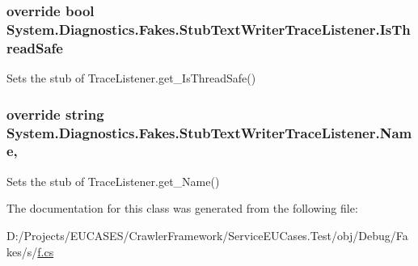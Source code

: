 \hypertarget{class_system_1_1_diagnostics_1_1_fakes_1_1_stub_text_writer_trace_listener_a860c82c764c4129de595b4f3e7bed4c7}{
\subsubsection[{Is\-Thread\-Safe}]{\setlength{\rightskip}{0pt plus 5cm}override bool System.\-Diagnostics.\-Fakes.\-Stub\-Text\-Writer\-Trace\-Listener.\-Is\-Thread\-Safe\hspace{0.3cm}{\ttfamily [get]}}}\label{class_system_1_1_diagnostics_1_1_fakes_1_1_stub_text_writer_trace_listener_a860c82c764c4129de595b4f3e7bed4c7}


Sets the stub of Trace\-Listener.\-get\-\_\-\-Is\-Thread\-Safe()

\hypertarget{class_system_1_1_diagnostics_1_1_fakes_1_1_stub_text_writer_trace_listener_a715843b2083049794e22762bbefdd2e5}{
\subsubsection[{Name}]{\setlength{\rightskip}{0pt plus 5cm}override string System.\-Diagnostics.\-Fakes.\-Stub\-Text\-Writer\-Trace\-Listener.\-Name\hspace{0.3cm}{\ttfamily [get]}, {\ttfamily [set]}}}\label{class_system_1_1_diagnostics_1_1_fakes_1_1_stub_text_writer_trace_listener_a715843b2083049794e22762bbefdd2e5}


Sets the stub of Trace\-Listener.\-get\-\_\-\-Name()



The documentation for this class was generated from the following file\-:\begin{DoxyCompactItemize}
\item 
D\-:/\-Projects/\-E\-U\-C\-A\-S\-E\-S/\-Crawler\-Framework/\-Service\-E\-U\-Cases.\-Test/obj/\-Debug/\-Fakes/s/\hyperlink{s_2f_8cs}{f.\-cs}\end{DoxyCompactItemize}
